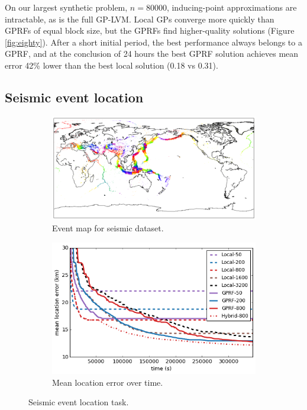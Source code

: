 \documentclass{article}
\begin{document}
On our largest synthetic problem, $n=80000$, inducing-point
approximations are intractable, as is the full GP-LVM. Local GPs converge more quickly
than GPRFs of equal block size, but the GPRFs find higher-quality
solutions (Figure \ref{fig:eighty}). After a short initial period, the
best performance always belongs to a GPRF, and at the conclusion of 24 hours the best GPRF
solution achieves mean error 42\% lower than the best local
solution (0.18 vs 0.31).

\subsection{Seismic event location}
\vspace{-0.2cm}
 \begin{figure}
 \centering
  \begin{subfigure}[t]{.50\textwidth}
                  \includegraphics[width=\textwidth, trim=0cm -2cm 0 0cm, clip]{seismic_X}
                  \caption{Event map for seismic dataset.}
                  \label{fig:seismicX}
          \end{subfigure}\hspace{0.5em}
  \begin{subfigure}[t]{.45\textwidth}
                  \includegraphics[width=\textwidth]{seismic_xcov_small}
                  \caption{Mean location error over time.}
                  \label{fig:seismicresults}
          \end{subfigure}
 \caption{Seismic event location task.}
 \label{fig:seismic}
\vspace{-0.5cm}
 \end{figure}
\end{document}
